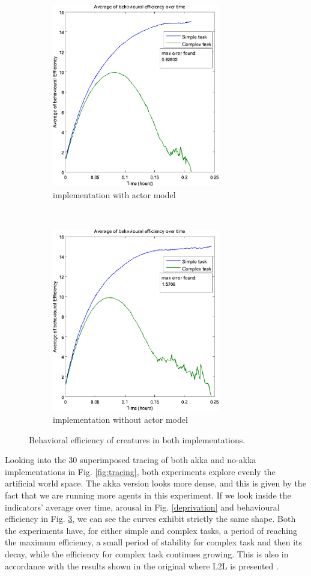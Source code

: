 \documentclass[runningheads]{llncs}
\begin{document}
\begin{figure}[h]
	\centering
	\begin{subfigure}[t]{1\textwidth}
		\centering
		\includegraphics[height=8cm]{efficienceAkka}
		\caption{implementation with actor model}
		\label{fig:behaviorWithAkka}
	\end{subfigure}%
\\ 
	\begin{subfigure}[t]{1\textwidth}
		\centering
		\includegraphics[height=8cm]{efficienceNoAkka}
		\caption{implementation without actor model}
		\label{fig:behaviorWithout}
	\end{subfigure}
	\caption{Behavioral efficiency of creatures in both implementations. }
	\label{behavior}
\end{figure}


Looking into the 30 superimposed tracing of both akka and no-akka implementations in Fig. \ref{fig:tracing}, both experiments explore evenly the artificial world space. The akka version looks more dense, and this is given by the fact that we are running more agents in this experiment. If we look inside the indicators' average over time, arousal in Fig. \ref{deprivation} and behavioural efficiency  in Fig. \ref{behavior}, we can see the curves exhibit strictly the same shape. Both the experiments have, for either simple and complex tasks, a period of reaching the maximum efficiency, a small period of stability for complex task and then its decay, while the efficiency for complex task continues growing. This is also in accordance with the results shown in the original where L2L is presented \cite{Campos}.  
\end{document}
